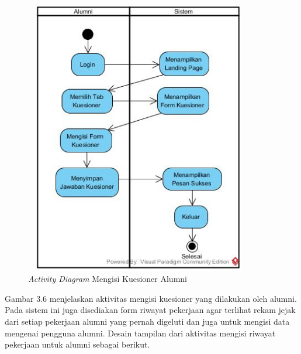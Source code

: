 \begin{figure}[H]
	\centering
	\includegraphics[width=10cm,height=12cm]{gambar/Activitykuesioneralumni}
	\caption{\emph{Activity Diagram} Mengisi Kuesioner Alumni}
	\label{activity_kuesioneralumni}
\end{figure}

Gambar 3.6 menjelaskan aktivitas mengisi kuesioner yang dilakukan oleh alumni. Pada sistem ini juga disediakan form riwayat pekerjaan agar terlihat rekam jejak dari setiap pekerjaan alumni yang pernah digeluti dan juga untuk mengisi data mengenai pengguna alumni. Desain tampilan dari aktivitas mengisi riwayat pekerjaan untuk alumni sebagai berikut.

